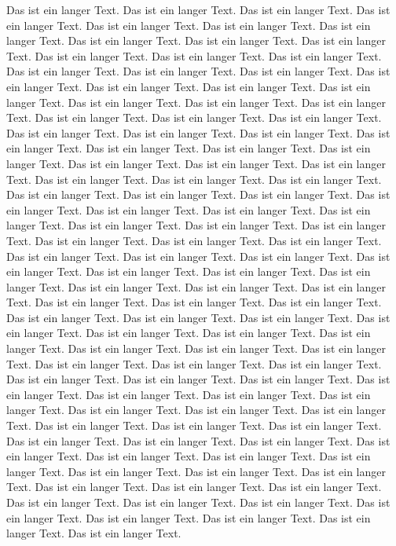 \documentclass{article}
\begin{document}
Das ist ein langer Text. Das ist ein langer Text.
Das ist ein langer Text. Das ist ein langer Text.
Das ist ein langer Text. Das ist ein langer Text.
Das ist ein langer Text. Das ist ein langer Text.
Das ist ein langer Text. Das ist ein langer Text.
Das ist ein langer Text. Das ist ein langer Text.
Das ist ein langer Text. Das ist ein langer Text.
Das ist ein langer Text. Das ist ein langer Text.
Das ist ein langer Text. Das ist ein langer Text.
Das ist ein langer Text. Das ist ein langer Text.
Das ist ein langer Text. Das ist ein langer Text.
Das ist ein langer Text. Das ist ein langer Text.
Das ist ein langer Text. Das ist ein langer Text.
Das ist ein langer Text. Das ist ein langer Text.
Das ist ein langer Text. Das ist ein langer Text.
Das ist ein langer Text. Das ist ein langer Text.
Das ist ein langer Text. Das ist ein langer Text.
Das ist ein langer Text. Das ist ein langer Text.
Das ist ein langer Text. Das ist ein langer Text.
Das ist ein langer Text. Das ist ein langer Text.
Das ist ein langer Text. Das ist ein langer Text.
Das ist ein langer Text. Das ist ein langer Text.
Das ist ein langer Text. Das ist ein langer Text.
Das ist ein langer Text. Das ist ein langer Text.
Das ist ein langer Text. Das ist ein langer Text.
Das ist ein langer Text. Das ist ein langer Text.
Das ist ein langer Text. Das ist ein langer Text.
Das ist ein langer Text. Das ist ein langer Text.
Das ist ein langer Text. Das ist ein langer Text.
Das ist ein langer Text. Das ist ein langer Text.
Das ist ein langer Text. Das ist ein langer Text.
Das ist ein langer Text. Das ist ein langer Text.
Das ist ein langer Text. Das ist ein langer Text.
Das ist ein langer Text. Das ist ein langer Text.
Das ist ein langer Text. Das ist ein langer Text.
Das ist ein langer Text. Das ist ein langer Text.
Das ist ein langer Text. Das ist ein langer Text.
Das ist ein langer Text. Das ist ein langer Text.
Das ist ein langer Text. Das ist ein langer Text.
Das ist ein langer Text. Das ist ein langer Text.
Das ist ein langer Text. Das ist ein langer Text.
Das ist ein langer Text. Das ist ein langer Text.
Das ist ein langer Text. Das ist ein langer Text.
Das ist ein langer Text. Das ist ein langer Text.
Das ist ein langer Text. Das ist ein langer Text.
Das ist ein langer Text. Das ist ein langer Text.
Das ist ein langer Text. Das ist ein langer Text.
Das ist ein langer Text. Das ist ein langer Text.
Das ist ein langer Text. Das ist ein langer Text.
Das ist ein langer Text. Das ist ein langer Text.
Das ist ein langer Text. Das ist ein langer Text.
Das ist ein langer Text. Das ist ein langer Text.
Das ist ein langer Text. Das ist ein langer Text.
Das ist ein langer Text. Das ist ein langer Text.
Das ist ein langer Text. Das ist ein langer Text.
Das ist ein langer Text. Das ist ein langer Text.
\end{document}
